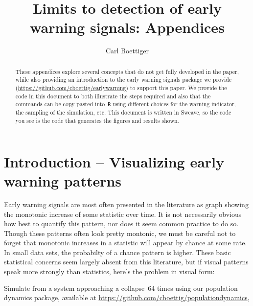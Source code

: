 \documentclass{elsarticle}
\begin{document}
\begin{frontmatter}
  \title{Limits to detection of early warning signals: Appendices}
  \author[davis]{Carl Boettiger}
  \address[davis]{Center for Population Biology, University of California, Davis, United States}

  \begin{abstract}
  These appendices explore several concepts that do not get fully developed in the paper, while also providing an introduction to the early warning signals package we provide (\href{https://github.com/cboettig/earlywarning}{https://github.com/cboettig/earlywarning}) to support this paper.  We provide the code in this document to both illustrate the steps required and also that the commands can be copy-pasted into~\texttt{R} using different choices for the warning indicator, the sampling of the simulation, etc.  This document is written in Sweave, so the code you see is the code that generates the figures and results shown.   
  \end{abstract}
 \end{frontmatter}

\section{Introduction -- Visualizing early warning patterns}






Early warning signals are most often presented in the literature as graph showing the monotonic increase of some statistic over time.  It is not necessarily obvious how best to quantify this pattern, nor does it seem common practice to do so.  Though these patterns often look pretty montonic, we must be careful not to forget that monotonic increases in a statistic will appear by chance at some rate.  In small data sets, the probabilty of a chance pattern is higher.  These basic statistical concerns seem largely absent from this literature, but if visual patterns speak more strongly than statistics, here's the problem in visual form:

Simulate from a system approaching a collapse~64 times using our population dynamics package, available at \href{https://github.com/cboettig/populationdynamics}{https://github.com/cboettig/populationdynamics},
\end{document}
